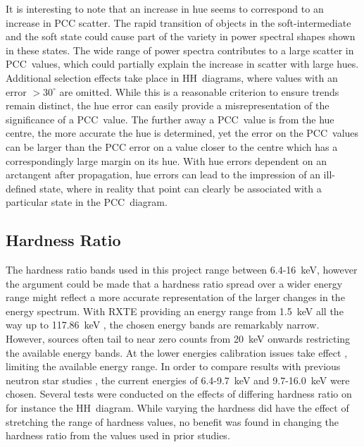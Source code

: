It is interesting to note that an increase in hue seems to correspond to an increase in \ac{PCC} scatter. The rapid transition of objects in the soft-intermediate and the soft state could cause part of the variety in power spectral shapes shown in these states. The wide range of power spectra contributes to a large scatter in \ac{PCC}~values, which could partially explain the increase in scatter with large hues.\\

Additional selection effects take place in \ac{HH}~diagrams, where values with an error $>\!30^\circ$ are omitted. While this is a reasonable criterion to ensure trends remain distinct, the hue error can easily provide a misrepresentation of the significance of a \ac{PCC}~value. The further away a \ac{PCC}~value is from the hue centre, the more accurate the hue is determined, yet the error on the \ac{PCC}~values can be larger than the \ac{PCC} error on a value closer to the centre which has a correspondingly large margin on its hue. With hue errors dependent on an arctangent after propagation, hue errors can lead to the impression of an ill-defined state, where in reality that point can clearly be associated with a particular state in the \ac{PCC}~diagram.\\

\subsection{Hardness Ratio}
The hardness ratio bands used in this project range between 6.4-16~keV, however the argument could be made that a hardness ratio spread over a wider energy range might reflect a more accurate representation of the larger changes in the energy spectrum. With \ac{RXTE} providing an energy range from 1.5~keV all the way up to 117.86~keV \citep{rxteenergychannel}, the chosen energy bands are remarkably narrow. However, sources often tail to near zero counts from 20~keV onwards restricting the available energy bands. At the lower energies calibration issues take effect \citep[see][]{gleissner2004long}, limiting the available energy range. In order to compare results with previous neutron star studies \citep[e.g.][]{gladstone2007analysing}, the current energies of 6.4-9.7~keV and 9.7-16.0~keV were chosen. Several tests were conducted on the effects of differing hardness ratio on for instance the \ac{HH}~diagram. While varying the hardness did have the effect of stretching the range of hardness values, no benefit was found in changing the hardness ratio from the values used in prior studies.

